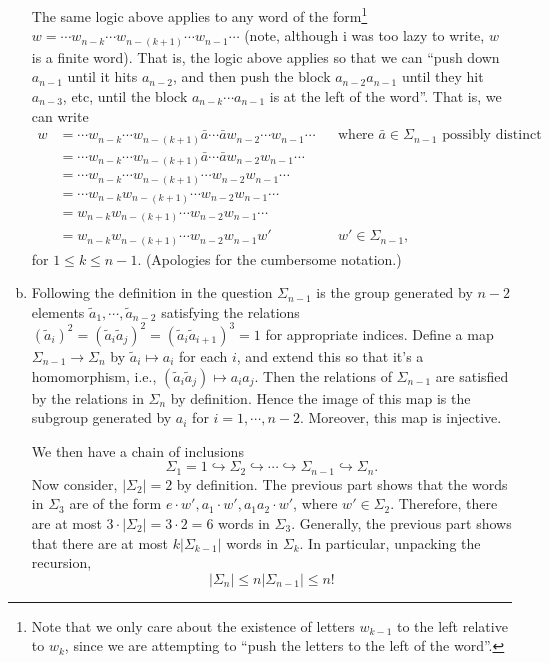 \documentclass[12pt,letterpaper,boxed]{hmcpset}
\newcommand{\abs}[1]{\left|#1\right|}
\begin{document}
\begin{solution}
\begin{enumerate}[(a)]
The same logic above applies to any word of the form\footnote{
	Note that we only care about the existence of letters $w_{k-1}$ to
	the left
	relative to $w_{k}$, since we are attempting to ``push the letters
	to the left of the word''. 
} 
	$w = \cdots w_{n - k} \cdots w_{n -(k+1)} \cdots w_{n-1} \cdots $
	(note, although i was too lazy to write, $w$ is a finite
	word). 
	That is, the logic above applies so that we can ``push down
	$a_{n-1}$ until it hits $a_{n-2}$, and then push the block
	$a_{n-2}a_{n-1}$ until they hit $a_{n-3}$, etc, until the block
	$a_{n-k}\cdots a_{n-1}$ is at the left of the word''. That is, we
	can write
\begin{align*}
	w 
	&= \cdots w_{n - k} \cdots w_{n-(k+1)}\bar a \cdots \bar a w_{n-2} \cdots w_{n-1} \cdots && \text{where $\bar a \in \Sigma_{n-1}$ possibly distinct} \\
	&= \cdots w_{n - k} \cdots w_{n-(k+1)}\bar a \cdots \bar a w_{n-2} w_{n-1} \cdots \\
	&= \cdots w_{n - k} \cdots w_{n-(k+1)} \cdots w_{n-2} w_{n-1} \cdots \\
	&= \cdots w_{n - k} w_{n-(k+1)} \cdots w_{n-2} w_{n-1} \cdots \\
	&= w_{n - k} w_{n-(k+1)} \cdots w_{n-2} w_{n-1} \cdots \\
	&= w_{n - k} w_{n-(k+1)} \cdots w_{n-2} w_{n-1} w' && w' \in \Sigma_{n-1},
\end{align*}
for $1 \leq k \leq n-1$. (Apologies for the cumbersome notation.)

\item 
Following the definition in the question $\Sigma_{n-1}$ is the group
generated by $n-2$ elements $\tilde a_1, \cdots, \tilde a_{n-2}$
satisfying the relations $(\tilde a_i)^2 = (\tilde a_i \tilde a_j)^2 =
(\tilde a_i \tilde a_{i+1})^3 = 1$ for appropriate indices. Define a
map $\Sigma_{n-1} \to \Sigma_n$ by $\tilde a_i \mapsto a_i$ for each
$i$, and extend this so that it's a homomorphism, i.e., $(\tilde a_i
\tilde a_j) \mapsto a_i a_j$. Then the relations of $\Sigma_{n-1}$ are
satisfied by the relations in $\Sigma_{n}$ by definition. Hence the
image of this map is the subgroup generated by $a_i$ for $i = 1,
\cdots, n-2$. Moreover, this map is injective.

We then have a chain of inclusions \[
	\Sigma_1 = 1 \hookrightarrow \Sigma_2 \hookrightarrow \cdots
	\hookrightarrow \Sigma_{n-1} \hookrightarrow \Sigma_{n}.
\]
Now consider, $\abs{\Sigma_2} = 2$ by definition. The previous
	part shows that the words in $\Sigma_3$ are of the form $e \cdot
	w', a_1 \cdot w', a_1 a_2 \cdot w'$, where $w' \in \Sigma_2$.
	Therefore, there are at most $3 \cdot \abs{\Sigma_2} = 3 \cdot 2 = 6$
	words in $\Sigma_3$. 
	Generally, the previous part shows that there are at most $k
	\abs{\Sigma_{k-1}}$ words in $\Sigma_k$. In particular, unpacking
	the recursion, \[
		\abs{\Sigma_n} \leq n \abs{\Sigma_{n-1}} \leq n!
	\]


\end{enumerate}
\end{solution}
\end{document}
